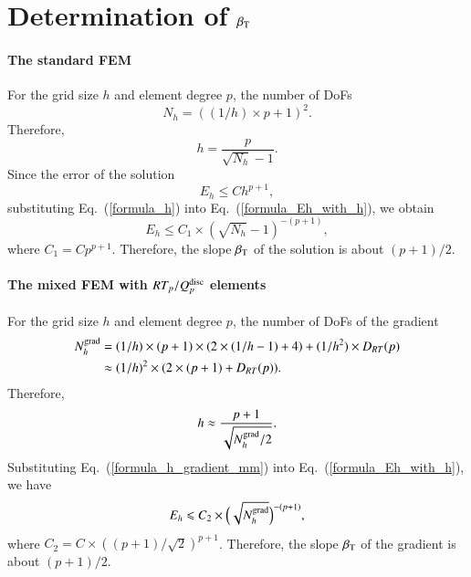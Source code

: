 \documentclass[review,3p]{elsarticle}
\begin{document}
\section{Determination of \texorpdfstring{$\beta_{\rm T}$}{beta T}}				\label{proof_slope_ET}

\paragraph{The standard FEM}
For the grid size $h$ and element degree $p$, the number of DoFs
\begin{equation}
N_h=((1/h) \times p+1)^2.			\label{formula_Nh}
\end{equation}
Therefore,
\begin{equation}
h=\frac{p}{\sqrt{N_h}-1}.		\label{formula_h}
\end{equation}
Since the error of the solution \cite{gockenbach2006understanding}
\begin{equation}
E_h \leqslant Ch^{p+1},			\label{formula_Eh_with_h}
\end{equation}
substituting Eq.~(\ref{formula_h}) into Eq.~(\ref{formula_Eh_with_h}), we obtain
\begin{equation}
E_h \leqslant C_1 \times (\sqrt{N_h}-1)^{-(p+1)},			\label{formula_Eh_with_Nh}
\end{equation}
where $C_1=C p^{p+1}$. Therefore, the slope $\beta_{\rm T}$ of the solution is about $(p+1)/2$.

\paragraph{The mixed FEM with \texorpdfstring{$RT_p/Q_p^{\rm disc}$}{RT_p/Q_p{disc}} elements}
For the grid size $h$ and element degree $p$, the number of DoFs of the gradient
\begin{equation}
\begin{aligned}
N_h^{\rm grad} &= (1/h) \times (p+1) \times (2 \times (1/h-1) + 4) + (1/h^2) \times D_{RT}(p) \\
			   &\approx (1/h)^2 \times (2 \times (p+1) + D_{RT}(p)).
\end{aligned}					\label{formula_Nh_gradient_mm}
\end{equation}					
Therefore,
\begin{equation}
h \approx \frac{p+1}{\sqrt{N_h^{\rm grad}/2}}.		\label{formula_h_gradient_mm}
\end{equation}
Substituting Eq.~(\ref{formula_h_gradient_mm}) into Eq.~(\ref{formula_Eh_with_h}), we have
\begin{equation}
E_h \leqslant C_2 \times \Big(\sqrt{N_h^{\rm grad}}\Big)^{-(p+1)},			\label{formula_Eh_with_Nh_gradient_mm}
\end{equation}
where $C_2=C \times ((p+1)/\sqrt{2})^{p+1}$. Therefore, the slope $\beta_{\rm T}$ of the gradient is about $(p+1)/2$.
\end{document}
